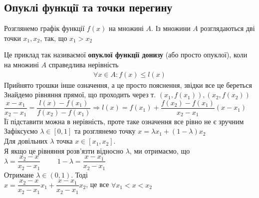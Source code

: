\documentclass[a4paper, 14pt]{extarticle}
\begin{document}
\subsection{Опуклі функції та точки перегину}
Розглянемо графік функції $f(x)$ на множині $A$. Із множини $A$ розглядаються дві точки $x_1,x_2$, так, що $x_1 > x_2$
\begin{figure}[H]
\centering
{}
\end{figure}
Це приклад так називаємої \textbf{опуклої функції донизу} (або просто опуклої), коли на множині $A$ справедлива нерівність
\begin{align*}
\forall x \in A: f(x) \leq l(x)
\end{align*}
Прийнято трошки інше означення, а це просто пояснення, звідки все це береться\\
Знайдемо рівняння прямої, що проходить через т. $(x_1,f(x_1)), (x_2,f(x_2))$\\
$\dfrac{x-x_1}{x_2-x_1} = \dfrac{l(x)-f(x_1)}{f(x_2)-f(x_1)} \Rightarrow l(x) = f(x_1) + \dfrac{f(x_2)-f(x_1)}{x_2-x_1}(x-x_1)$\\
Її підставити можна в нерівність, проте таке означення все рівно не є зручним\\
Зафіксуємо $\lambda \in [0,1]$ та розглянемо точку $x = \lambda x_1 + (1-\lambda) x_2$\\
Для довільних $\lambda$ точка $x \in [x_1,x_2]$. \\
Я якщо це рівняння розв'язти відносно $\lambda$, ми отримаємо, що\\
$\lambda = \dfrac{x_2-x}{x_2-x_1} \hspace{1cm} 1-\lambda = \dfrac{x-x_1}{x_2-x_1}$\\
Отримане $\lambda \in (0,1)$. Тоді\\
$x = \dfrac{x_2-x}{x_2-x_1} x_1 + \dfrac{x-x_1}{x_2-x_1} x_2$, це все $\forall x_1 < x < x_2$\\
\end{document}
